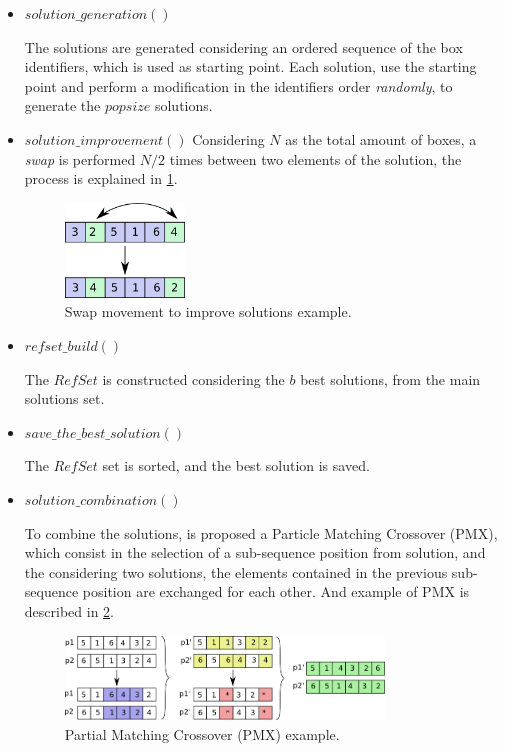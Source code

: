 \begin{itemize}
    \item $solution\_generation()$

        The solutions are generated considering an ordered sequence
        of the box identifiers, which is used as starting point.
        Each solution, use the starting point and perform a modification in the identifiers order \emph{randomly},
        to generate the $popsize$ solutions.

    \item $solution\_improvement()$
        Considering $N$ as the total amount of boxes,
        a \emph{swap} is performed $N/2$ times between two elements of the solution,
        the process is explained in \ref{fig:swap}.

        \begin{figure}[h!t]
            \centering
            \includegraphics[width=0.3\textwidth]{img/ia-swap}
            \caption{Swap movement to improve solutions example.}
            \label{fig:swap}
        \end{figure}

    \item $refset\_build()$

        The $RefSet$ is constructed considering the $b$ best solutions,
        from the main solutions set.

    \item $save\_the\_best\_solution()$

        The $RefSet$ set is sorted, and the best solution is saved.

    \item $solution\_combination()$

        To combine the solutions, is proposed a Particle Matching Crossover (PMX),
        which consist in the selection of a sub-sequence position from solution,
        and the considering two solutions, the elements contained in the
        previous sub-sequence position are exchanged for each other.
        And example of PMX is described in \ref{fig:pmx}.

        \begin{figure}[h!t]
            \centering
            \includegraphics[width=0.8\textwidth]{img/ia-pmx}
            \caption{Partial Matching Crossover (PMX) example.}
            \label{fig:pmx}
        \end{figure}


\end{itemize}
